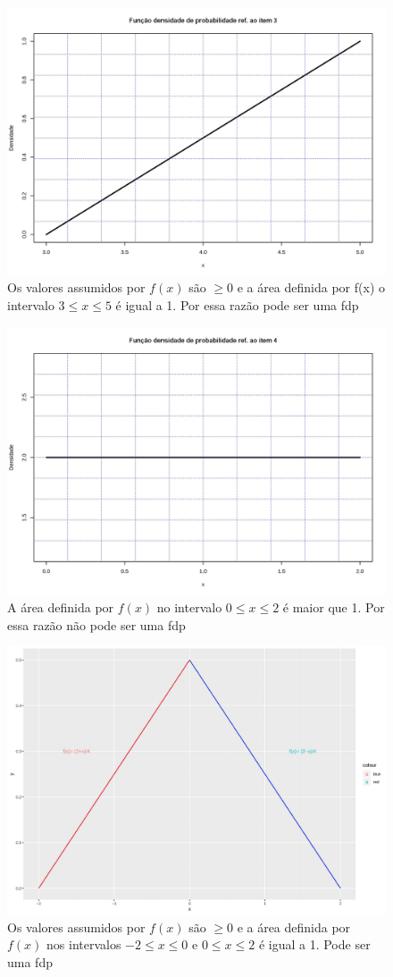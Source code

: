 \documentclass[
]{book}
\begin{document}
\hfill\break

\begin{figure}

{\centering \includegraphics[width=0.6\linewidth]{images6/item3} 

}

\caption{Os valores assumidos por $f(x)$ são $\ge 0$ e a área definida por f(x) o intervalo $3 \le x \le 5$ é igual a 1. Por essa razão pode ser uma fdp}\label{fig:fig18}
\end{figure}

\hfill\break

\begin{figure}

{\centering \includegraphics[width=0.6\linewidth]{images6/item4} 

}

\caption{A área definida por $f(x)$ no intervalo $0 \le x \le 2$ é maior que 1. Por essa razão não pode ser uma fdp}\label{fig:fig19}
\end{figure}

\hfill\break

\begin{figure}

{\centering \includegraphics[width=0.6\linewidth]{images6/item5} 

}

\caption{Os valores assumidos por $f(x)$ são $\ge 0$ e a área definida por $f(x)$ nos intervalos $-2 \le x \le 0$ e $0 \le x \le 2$ é igual a 1. Pode ser uma fdp}\label{fig:fig20}
\end{figure}
\end{document}
